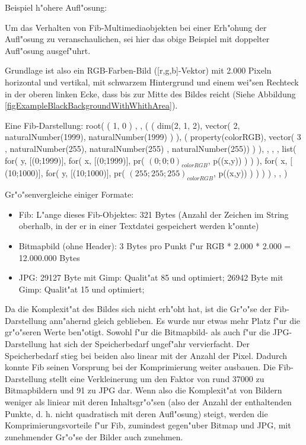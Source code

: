 \begin{flushleft}
\bigskip\noindent
Beispiel h"ohere Aufl"osung:

Um das Verhalten von Fib-Multimediaobjekten bei einer Erh"ohung der Aufl"osung zu veranschaulichen, sei hier das obige Beispiel mit doppelter Aufl"osung ausgef"uhrt.

Grundlage ist also ein RGB-Farben-Bild ([r,g,b]-Vektor) mit 2.000 Pixeln horizontal und vertikal, mit schwarzem Hintergrund und einem wei"sen Rechteck in der oberen linken Ecke, dass bis zur Mitte des Bildes reicht (Siehe Abbildung \ref{figExampleBlackBackgroundWithWhithArea}).

\bigskip\noindent
Eine Fib-Darstellung:
root( ( 1, 0 ) , , ( ( dim(2, 1, 2), vector( 2, naturalNumber(1999), naturalNumber(1999) ) ), ( property(colorRGB), vector( 3 , naturalNumber(255), naturalNumber(255) , naturalNumber(255)) ) ), , , , list( for( y, $[$(0;1999)$]$, for( x, $[$(0;1999)$]$, pr( $(0;0;0)_{colorRGB}$, p((x,y)) ) ) ), for( x, $[$(10;1000)$]$, for( y, $[$(10;1000)$]$,  pr( $(255;255;255)_{colorRGB}$, p((x,y)) ) ) ) )  , , )


\bigskip\noindent
Gr"o"senvergleiche einiger Formate:
\begin{itemize}
 \item Fib: L"ange dieses Fib-Objektes: 321 Bytes (Anzahl der Zeichen im String oberhalb, in der er in einer Textdatei gespeichert werden k"onnte)
 \item Bitmapbild (ohne Header): 3 Bytes pro Punkt f"ur RGB * 2.000 * 2.000 = 12.000.000 Bytes
 \item JPG: 29127 Byte mit Gimp: Qualit"at 85 und optimiert; 26942 Byte mit Gimp: Qualit"at 15 und optimiert;
\end{itemize}
\end{flushleft}

\noindent
Da die Komplexit"at des Bildes sich nicht erh"oht hat, ist die Gr"o"se der Fib-Darstellung ann"ahernd gleich geblieben. Es wurde nur etwas mehr Platz f"ur die gr"o"seren Werte ben"otigt.
Sowohl f"ur die Bitmapbild- als auch f"ur die JPG-Darstellung hat sich der Speicherbedarf ungef"ahr vervierfacht. Der Speicherbedarf stieg bei beiden also linear mit der Anzahl der Pixel. Dadurch konnte Fib seinen Vorsprung bei der Komprimierung weiter ausbauen.
Die Fib-Darstellung stellt eine Verkleinerung um den Faktor von rund 37000 zu Bitmapbildern und 91 zu JPG dar.
Wenn also die Komplexit"at von Bildern weniger als liniear mit deren Inhaltsgr"o"sen (also der Anzahl der enthaltenden Punkte, d. h. nicht quadratisch mit deren Aufl"osung) steigt, werden die Komprimierungsvorteile f"ur Fib, zumindest gegen"uber Bitmap und JPG, mit zunehmender Gr"o"se der Bilder auch zunehmen.


